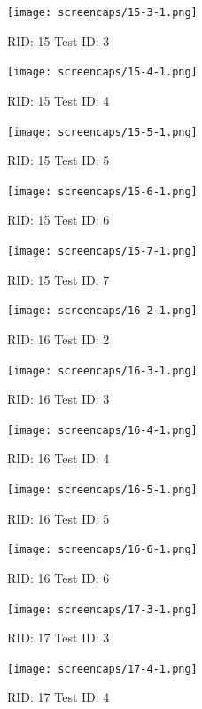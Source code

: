 \documentclass{article}
\begin{document}
\begin{figure}[H]
\texttt{[image: screencaps/15-3-1.png]}
\caption{RID: 15 Test ID: 3}
\end{figure}


\begin{figure}[H]
\texttt{[image: screencaps/15-4-1.png]}
\caption{RID: 15 Test ID: 4}
\end{figure}

\begin{figure}[H]
\texttt{[image: screencaps/15-5-1.png]}
\caption{RID: 15 Test ID: 5}
\end{figure}


\begin{figure}[H]
\texttt{[image: screencaps/15-6-1.png]}
\caption{RID: 15 Test ID: 6}
\end{figure}

\begin{figure}[H]
\texttt{[image: screencaps/15-7-1.png]}
\caption{RID: 15 Test ID: 7}
\end{figure}



\begin{figure}[H]
\texttt{[image: screencaps/16-2-1.png]}
\caption{RID: 16 Test ID: 2}
\end{figure}

\begin{figure}[H]
\texttt{[image: screencaps/16-3-1.png]}
\caption{RID: 16 Test ID: 3}
\end{figure}



\begin{figure}[H]
\texttt{[image: screencaps/16-4-1.png]}
\caption{RID: 16 Test ID: 4}
\end{figure}


\begin{figure}[H]
\texttt{[image: screencaps/16-5-1.png]}
\caption{RID: 16 Test ID: 5}
\end{figure}

\begin{figure}[H]
\texttt{[image: screencaps/16-6-1.png]}
\caption{RID: 16 Test ID: 6}
\end{figure}



\begin{figure}[H]
\texttt{[image: screencaps/17-3-1.png]}
\caption{RID: 17 Test ID: 3}
\end{figure}


\begin{figure}[H]
\texttt{[image: screencaps/17-4-1.png]}
\caption{RID: 17 Test ID: 4}
\end{figure}
\end{document}
